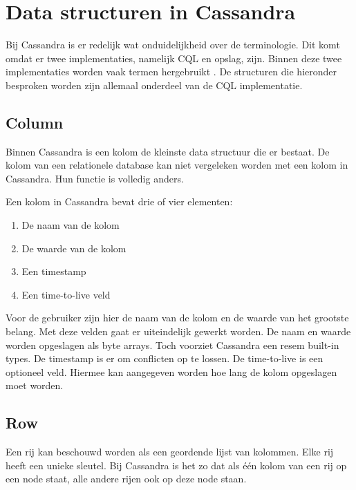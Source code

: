 \chapter{Data structuren in Cassandra}
\label{ch:cassandra_data}

Bij Cassandra is er redelijk wat onduidelijkheid over de terminologie.
Dit komt omdat er twee implementaties, namelijk CQL en opslag, zijn.
Binnen deze twee implementaties worden vaak termen hergebruikt \citep{Ahmed2015Terminology}.
De structuren die hieronder besproken worden zijn allemaal onderdeel van de CQL implementatie.

\section{Column}
Binnen Cassandra is een kolom de kleinste data structuur die er bestaat.
De kolom van een relationele database kan niet vergeleken worden met een kolom in Cassandra.
Hun functie is volledig anders.

Een kolom in Cassandra bevat drie of vier elementen:
\begin{enumerate}
	\item De naam van de kolom
	\item De waarde van de kolom
	\item Een timestamp
	\item Een time-to-live veld
\end{enumerate}

Voor de gebruiker zijn hier de naam van de kolom en de waarde van het grootste belang.
Met deze velden gaat er uiteindelijk gewerkt worden.
De naam en waarde worden opgeslagen als byte arrays.
Toch voorziet Cassandra een resem built-in types.
De timestamp is er om conflicten op te lossen.
De time-to-live is een optioneel veld.
Hiermee kan aangegeven worden hoe lang de kolom opgeslagen moet worden.

\section{Row}
Een rij kan beschouwd worden als een geordende lijst van kolommen.
Elke rij heeft een unieke sleutel.
Bij Cassandra is het zo dat als één kolom van een rij op een node staat, alle andere rijen ook op deze node staan.

